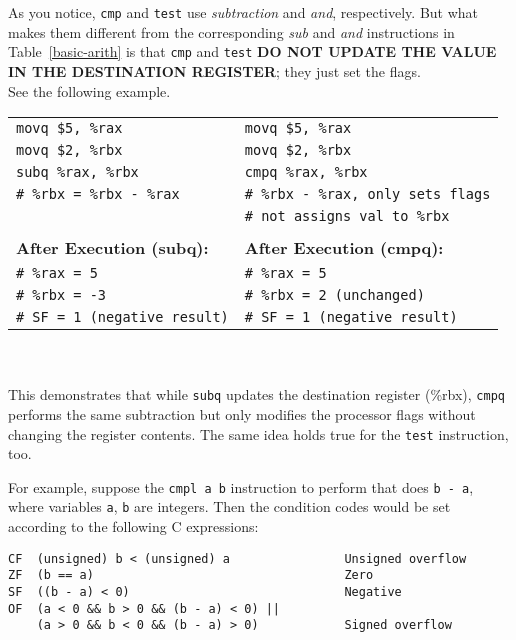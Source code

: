 \documentclass{article}
\begin{document}
As you notice, \texttt{cmp} and \texttt{test} use \textit{subtraction} and \textit{and}, respectively. But what makes them different from the corresponding \textit{sub} and \textit{and} instructions in Table~\ref{basic-arith} is that \texttt{cmp} and \texttt{test} \textbf{DO NOT UPDATE THE VALUE IN THE DESTINATION REGISTER}; they just set the flags.\\
See the following example.
\\
\begin{tabular}{l l}
\texttt{movq \$5, \%rax}   & \texttt{movq \$5, \%rax}   \\
\texttt{movq \$2, \%rbx}   & \texttt{movq \$2, \%rbx}   \\
\texttt{subq \%rax, \%rbx} & \texttt{cmpq \%rax, \%rbx} \\ 
\texttt{\# \%rbx = \%rbx - \%rax} & \texttt{\# \%rbx - \%rax, only sets flags} \\ 
                                & \texttt{\# not assigns val to \%rbx} \\ 
\\
\textbf{After Execution (subq):}  & \textbf{After Execution (cmpq):}  \\
\texttt{\# \%rax = 5}      & \texttt{\# \%rax = 5}      \\
\texttt{\# \%rbx = -3}     & \texttt{\# \%rbx = 2  (unchanged)} \\
\texttt{\# SF = 1 (negative result)} & \texttt{\# SF = 1 (negative result)}
\end{tabular}
\\
\\
This demonstrates that while \texttt{subq} updates the destination register (\%rbx), \texttt{cmpq} performs the same subtraction but only modifies the processor flags without changing the register contents. The same idea holds true for the \texttt{test} instruction, too.


For example, suppose the \texttt{cmpl a b} instruction to perform that does \texttt{b - a}, where variables \texttt{a}, \texttt{b} are integers. Then the condition codes would be set according to the following C expressions:

\begin{Verbatim}[frame=single]
CF  (unsigned) b < (unsigned) a                Unsigned overflow
ZF  (b == a)                                   Zero
SF  ((b - a) < 0)                              Negative
OF  (a < 0 && b > 0 && (b - a) < 0) || 
    (a > 0 && b < 0 && (b - a) > 0)            Signed overflow
\end{Verbatim}
\end{document}
